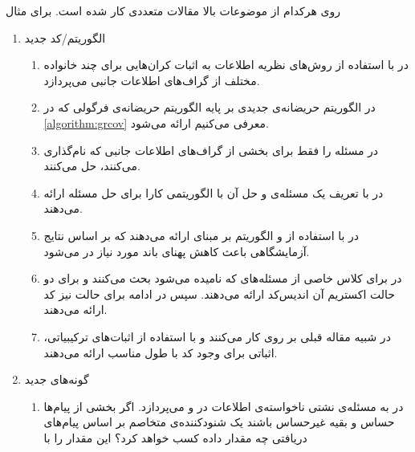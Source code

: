  روی هرکدام از موضوعات بالا مقالات متعددی کار شده است. برای مثال
 \begin{enumerate}
 	\item الگوریتم‌/کد جدید
 	\begin{enumerate}
 		\item 
 		 در
 		\cite{8278015}
 		با استفاده از روش‌های نظریه اطلاعات به اثبات کران‌هایی برای چند خانواده مختلف از گراف‌های اطلاعات جانبی می‌پردازد.
 		\item 
 		در
 		\cite{10313405}
 		الگوریتم حریضانه‌ی جدیدی بر پایه الگوریتم حریضانه‌ی فرگولی که در
   \autoref{algorithm:grcov}
   معرفی می‌کنیم ارائه می‌شود.
 		\item
 		در
 		\cite{8871209}
 		مسئله را فقط برای بخشی از گراف‌های اطلاعات جانبی که
 		نام‌گذاری می‌کنند، حل می‌کنند.
 		\item
 		در
 		\cite{9759449}
 		با تعریف یک مسئله‌ی
 		و حل آن با 
 		الگوریتمی کارا برای حل مسئله ارائه می‌دهند.
 		\item
 		در
 		\cite{8682270}
 		با استفاده از
 		\picod
 		و الگوریتم بر مبنای
 		ارائه می‌دهند که بر اساس نتایج آزمایشگاهی باعث کاهش پهنای باند مورد نیاز در
 		می‌شود.
 		\item
 		در
 		\cite{sasi2019pliable}
 		برای کلاس خاصی از مسئله‌‌های
 		\picod
 		که
 		نامیده می‌شود بحث می‌کنند و برای دو حالت اکستریم آن اندیس‌کد ارائه می‌دهند. سپس در ادامه برای حالت
 		نیز کد ارائه می‌دهند.
 		\item 
 		در
 		\cite{8613483}
 		شبیه مقاله قبلی بر روی
 		کار می‌کنند و با استفاده از اثبات‌های ترکیبیاتی، اثباتی برای وجود کد با طول مناسب ارائه می‌دهند.
 	\end{enumerate}
 	\item گونه‌های جدید
 	\begin{enumerate}
 		\item
 		 در
 		\cite{10015670}
 		به مسئله‌ی نشتی ناخواسته‌ی اطلاعات در
 		\icod
 		و
 		\picod
 		می‌پردازد. اگر بخشی از پیام‌ها حساس و بقیه غیرحساس باشند یک شنودکننده‌ی متخاصم بر اساس پیام‌های دریافتی چه مقدار داده کسب خواهد کرد؟ این مقدار را با

\end{enumerate}
\end{enumerate}
